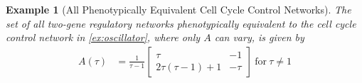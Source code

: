 \documentclass{article}
\newcommand{\plr}[1]{\todo[color=blue!25]{#1}}
\newcommand{\plri}[1]{{\color{blue}\it #1}}
\newcommand{\plr}[1]{{\color{blue}\it #1}}
\newcommand{\plri}[1]{\plr{#1}}
\newcommand{\1}{\mathbbm{1}}
\newtheorem{example}{Example}
\begin{document}
%
%
%
%
%
%
 \begin{example}[All Phenotypically Equivalent Cell Cycle Control Networks] \label{ex:all_osc}
    The set of all two-gene regulatory networks phenotypically equivalent to the cell cycle control network in \ref{ex:oscillator}, where only $A$ can vary, is given by
    \begin{align*}
      A(\tau) &= \frac{1}{\tau-1} \begin{bmatrix} \tau & -1 \\ 2 \tau(\tau - 1) + 1 &  -\tau \end{bmatrix} \ \text{for} \ \tau \neq 1
    \end{align*}
    \begin{figure}[H]
    \centering
\end{figure}
\end{example}
\end{document}
